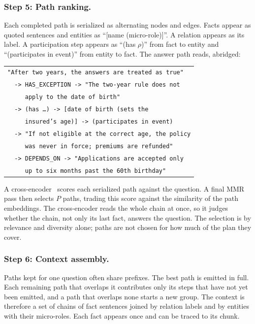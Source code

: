 \documentclass[sigconf, review, anonymous]{acmart}
\begin{document}
\subsubsection*{Step 5: Path ranking.}
Each completed path is serialized as alternating nodes and edges. Facts appear as quoted sentences and entities as ``[name (micro-role)]''. A relation appears as its label. A participation step appears as ``(has $\rho$)'' from fact to entity and ``(participates in event)'' from entity to fact. The answer path reads, abridged:
\begin{center}
\small
\begin{tabular}{@{}l@{}}
\texttt{"After two years, the answers are treated as true"}\\
\texttt{\ \ -> HAS\_EXCEPTION -> "The two-year rule does not}\\
\texttt{\ \ \ \ \ apply to the date of birth"}\\
\texttt{\ \ -> (has \ldots) -> [date of birth (sets the}\\
\texttt{\ \ \ \ \ insured's age)] -> (participates in event)}\\
\texttt{\ \ -> "If not eligible at the correct age, the policy}\\
\texttt{\ \ \ \ \ was never in force; premiums are refunded"}\\
\texttt{\ \ -> DEPENDS\_ON -> "Applications are accepted only}\\
\texttt{\ \ \ \ \ up to six months past the 60th birthday"}
\end{tabular}
\end{center}
A cross-encoder~\cite{nogueira2019passage} scores each serialized path against the question. A final MMR pass then selects $P$ paths, trading this score against the similarity of the path embeddings. The cross-encoder reads the whole chain at once, so it judges whether the chain, not only its last fact, answers the question. The selection is by relevance and diversity alone; paths are not chosen for how much of the plan they cover.

\subsubsection*{Step 6: Context assembly.}
Paths kept for one question often share prefixes. The best path is emitted in full. Each remaining path that overlaps it contributes only its steps that have not yet been emitted, and a path that overlaps none starts a new group. The context is therefore a set of chains of fact sentences joined by relation labels and by entities with their micro-roles. Each fact appears once and can be traced to its chunk.
\end{document}
